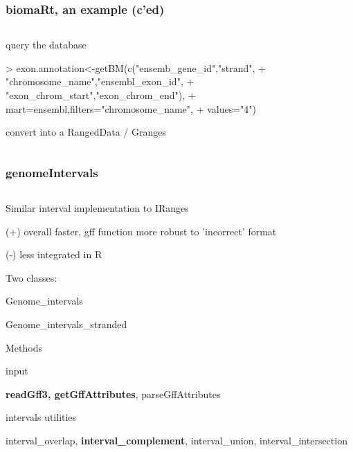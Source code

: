 \documentclass{beamer}
\begin{document}
\begin{frame}[fragile]
\frametitle{biomaRt, an example (c'ed)}
\begin{column}{1\textwidth}
  \bit
      \item   query the database
          \begin{uncoverenv}
\begin{Schunk}
\begin{Sinput}
> exon.annotation<-getBM(c("ensemb_gene_id","strand",
+                 "chromosome_name","ensembl_exon_id",
+                 "exon_chrom_start","exon_chrom_end"),
+                 mart=ensembl,filters="chromosome_name",
+                 values="4")
\end{Sinput}
\end{Schunk}
          \end{uncoverenv}   
    \item convert into a RangedData / Granges
  \eit
\end{column}
\end{frame}


\begin{frame}
\frametitle{genomeIntervals}
\begin{column}{1\textwidth}
  \bit
      \item   Similar interval implementation to IRanges
        \bit
            \item (+) overall faster, gff function more robust to 'incorrect' format
            \item (-) less integrated in R
        \eit
      \item Two classes:
        \bit
            \item Genome\_intervals
            \item Genome\_intervals\_stranded
        \eit
      \item Methods
        \bit
            \item input
              \bit
                  \item \textbf{ readGff3, getGffAttributes}, parseGffAttributes
              \eit
            \item intervals utilities
              \bit
                  \item interval\_overlap, \textbf{interval\_complement}, interval\_union, interval\_intersection
              \eit
        \eit
  \eit
\end{column}
\end{frame}
\end{document}
